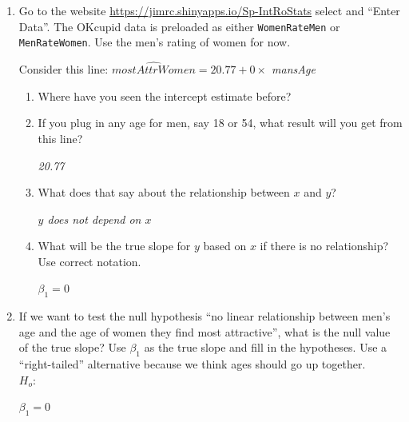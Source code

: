 \begin{enumerate}
\item Go to the website
  \url{https://jimrc.shinyapps.io/Sp-IntRoStats}
  select  and ``Enter Data''. The OKcupid data is
  preloaded as either {\tt WomenRateMen} or {\tt MenRateWomen}. Use
  the men's rating of women for now.

Consider this line:
  {\it  $\widehat{mostAttrWomen} = 20.77 + 0 \times $ mansAge   }


    \begin{enumerate} 
    \item Where have you seen the intercept estimate before?

      \item If you plug in any age for men, say 18 or 54, what result
        will you get from this line?
\begin{students}
 \vspace{1.cm}      
\end{students}

\begin{key}
  {\it   20.77    }
\end{key}
      \item What does that say about the relationship between $x$ and
        $y$?
\begin{students}
 \vspace{1.cm}      
\end{students}

\begin{key}
  {\it  $y$ does not depend on $x$  }
\end{key}

      \item What will be the true slope for $y$ based on $x$ if there
        is no relationship?  Use    correct notation.
\begin{students}
 \vspace{1cm}      
\end{students}

\begin{key}
  {\it  $\beta_1=0$   }
\end{key}
      \end{enumerate}
      

\item  If we  want to test the null hypothesis ``no linear
  relationship between men's age and the age of women they find most
  attractive'', what is the null value of the true slope?  Use $\beta_1$ as the
  true slope and fill in the hypotheses.  Use a ``right-tailed''
  alternative because we think ages should go up together.\\
  $H_o:$
\begin{students}
 \vspace{1cm}      
\end{students}
\begin{key}
  {\it  $\beta_1 = 0$   }
\end{key}


\end{enumerate}
